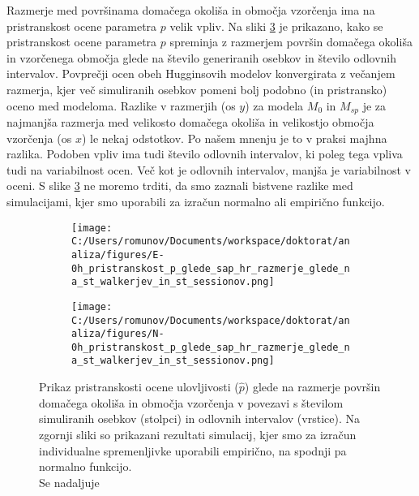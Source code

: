 Razmerje med površinama domačega okoliša in območja vzorčenja ima na pristranskost ocene parametra $p$ velik vpliv. Na sliki \ref{sli:slika6} je prikazano, kako se pristranskost ocene parametra $p$ spreminja z razmerjem površin domačega okoliša in vzorčenega območja glede na število generiranih osebkov in število odlovnih intervalov. Povprečji ocen obeh Hugginsovih modelov konvergirata z večanjem razmerja, kjer več simuliranih osebkov pomeni bolj podobno (in pristransko) oceno med modeloma. Razlike v razmerjih (os $y$) za modela $M_0$ in $M_{sp}$ je za najmanjša razmerja med velikosto domačega okoliša in velikostjo območja vzorčenja (os $x$) le nekaj odstotkov. Po našem mnenju je to v praksi majhna razlika. Podoben vpliv ima tudi število odlovnih intervalov, ki poleg tega vpliva tudi na variabilnost ocen. Več kot je odlovnih intervalov, manjša je variabilnost v oceni. S slike \ref{sli:slika6} ne moremo trditi, da smo zaznali bistvene razlike med simulacijami, kjer smo uporabili za izračun normalno ali empirično funkcijo.

\begin{figure}[H]
\centering
\begin{subfigure}[b]{0.8\textwidth}
  \centering
  \texttt{[image: C:/Users/romunov/Documents/workspace/doktorat/analiza/figures/E-0h\_pristranskost\_p\_glede\_sap\_hr\_razmerje\_glede\_na\_st\_walkerjev\_in\_st\_sessionov.png]}
  \label{sli:sub6.1}
\end{subfigure}

\begin{subfigure}[b]{0.8\textwidth}
  \centering
  \texttt{[image: C:/Users/romunov/Documents/workspace/doktorat/analiza/figures/N-0h\_pristranskost\_p\_glede\_sap\_hr\_razmerje\_glede\_na\_st\_walkerjev\_in\_st\_sessionov.png]}
  \label{sli:sub6.2}
\end{subfigure}
\caption[Prikaz pristranskosti ocene ulovljivosti glede na razmerje površin domačega okoliša in območja vzorčenja v povezavi s številom simuliranih osebkov in odlovnih intervalov]{Prikaz pristranskosti ocene ulovljivosti ($\hat{p}$) glede na razmerje površin domačega okoliša in območja vzorčenja v povezavi s številom simuliranih osebkov (stolpci) in odlovnih intervalov (vrstice). Na zgornji sliki so prikazani rezultati simulacij, kjer smo za izračun individualne spremenljivke uporabili empirično, na spodnji pa normalno funkcijo.\\
Se nadaljuje
}
\label{sli:slika6}
\end{figure}

